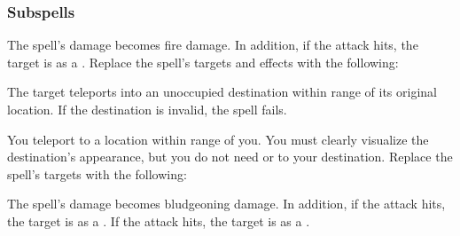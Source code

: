 \subsubsection{Subspells}
The spell's damage becomes fire damage.
In addition, if the attack hits, the target is  as a .
Replace the spell's targets and effects with the following:
\begin{spellcontent}
\begin{augmenttargetinginfo}
\end{augmenttargetinginfo}
\begin{augmenteffects}
\spelleffect
The target teleports into an unoccupied destination within \rngmed range of its original location.
If the destination is invalid, the spell fails.
\end{augmenteffects}
\end{spellcontent}
You teleport to a location within \rngext range of you.
You must clearly visualize the destination's appearance, but you do not need  or  to your destination.
Replace the spell's targets with the following:
\begin{spellcontent}
\begin{augmenttargetinginfo}
\end{augmenttargetinginfo}
\end{spellcontent}
The spell's damage becomes bludgeoning damage.
In addition, if the attack hits, the target is  as a .
If the attack hits, the target is  as a .
